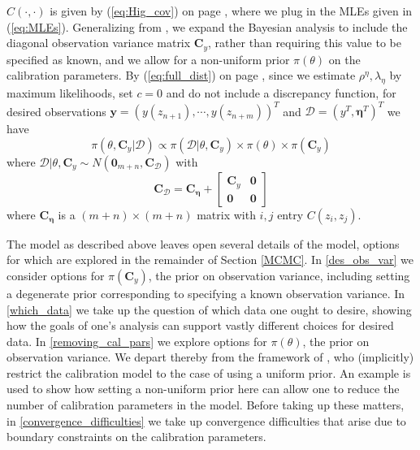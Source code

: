 \documentclass{article}
\begin{document}
$C(\cdot,\cdot)$ is given by (\ref{eq:Hig_cov}) on page \pageref{eq:Hig_cov}, where we plug in the MLEs given in (\ref{eq:MLEs}). Generalizing from \cite{Kennedy2006}, we expand the Bayesian analysis to include the diagonal observation variance matrix $\mathbf C_y$, rather than requiring this value to be specified as known, and we allow for a non-uniform prior $\pi(\theta)$ on the calibration parameters. By (\ref{eq:full_dist}) on page \pageref{eq:full_dist}, 
since we estimate $\rho^\eta,\lambda_\eta$ by maximum likelihoods, set $c=0$ and do not include a discrepancy function, for desired observations $\mathbf y=(y (z_{n+1}),\cdots,y(z_{n+m}))^T$ and $\mathcal D=(y^T, \boldsymbol\eta^T)^T$ we have
\begin{equation}\label{eq:the_model}
\pi(\theta,\mathbf C_y|\mathcal D) \propto \pi (\mathcal D|\theta,\mathbf C_y)\times \pi(\theta)\times \pi(\mathbf C_y)
\end{equation}
where $\mathcal D|\theta,\mathbf C_y \sim N(\boldsymbol 0_{m+n}, \mathbf C_{\mathcal D})$ with 
\begin{equation}\label{eq:the_covariance}
\mathbf C_{\mathcal D} = \mathbf C_{\boldsymbol\eta} + 
\begin{bmatrix}
\mathbf C_y & \boldsymbol 0\\ 
\boldsymbol 0 & \boldsymbol 0
\end{bmatrix}
\end{equation}
where $\mathbf C_{\boldsymbol\eta}$ is a $(m+n)\times(m+n)$ matrix with $i,j$ entry $C(z_i,z_j)$.

The model as described above leaves open several details of the model, options for which are explored in the remainder of Section \ref{MCMC}. In \ref{des_obs_var} we consider options for $\pi(\mathbf C_y)$, the prior on observation variance, including setting a degenerate prior corresponding to specifying a known observation variance. In \ref{which_data} we take up the question of which data one ought to desire, showing how the goals of one's analysis can support vastly different choices for desired data. In \ref{removing_cal_pars} we explore options for $\pi(\theta)$, the prior on observation variance. We depart thereby from the framework of \cite{Kennedy2006}, who (implicitly) restrict the calibration model to the case of using a uniform prior. An example is used to show how setting a non-uniform prior here can allow one to reduce the number of calibration parameters in the model. Before taking up these matters, in \ref{convergence_difficulties} we take up convergence difficulties that arise due to boundary constraints on the calibration parameters.
\end{document}

